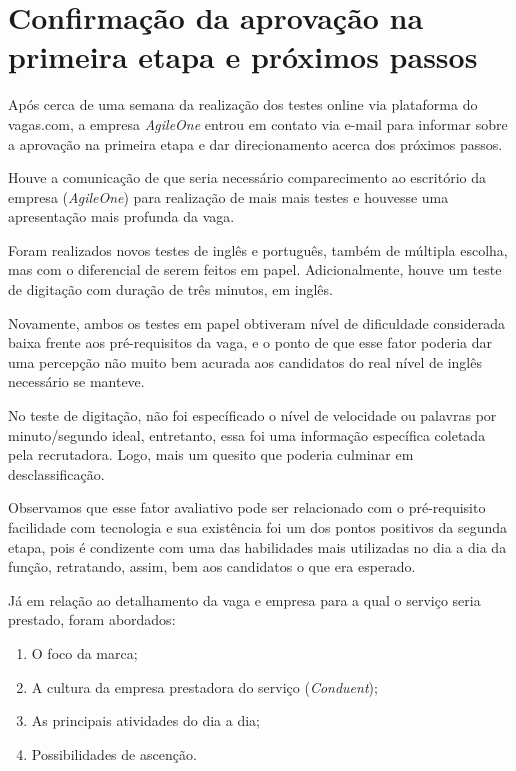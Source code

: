 \documentclass[12pt]{article}
\begin{document}
\maketitle


\section*{Confirmação da aprovação na primeira etapa e próximos passos}

Após cerca de uma semana da realização dos testes online via plataforma do vagas.com, a empresa \emph {AgileOne} entrou em contato via e-mail para informar sobre a aprovação na primeira etapa e dar direcionamento acerca dos próximos passos. 

Houve a comunicação de que seria necessário comparecimento ao escritório da empresa (\emph {AgileOne}) para realização de mais mais testes e houvesse uma apresentação mais profunda da vaga.

Foram realizados novos testes de inglês e português, também de múltipla escolha, mas com o diferencial de serem feitos em papel. Adicionalmente, houve um teste de digitação com duração de três minutos, em inglês. 

Novamente, ambos os testes em papel obtiveram nível de dificuldade considerada baixa frente aos pré-requisitos da vaga, e o ponto de que esse fator poderia dar uma percepção não muito bem acurada aos candidatos do real nível de inglês necessário se manteve. 

No teste de digitação, não foi específicado o nível de velocidade ou palavras por minuto/segundo ideal, entretanto, essa foi uma informação específica coletada pela recrutadora. Logo, mais um quesito que poderia culminar em desclassificação. 

Observamos que esse fator avaliativo pode ser relacionado com o pré-requisito facilidade com tecnologia e sua existência foi um dos pontos positivos da segunda etapa, pois é condizente com uma das habilidades mais utilizadas no dia a dia da função, retratando, assim, bem aos candidatos o que era esperado. 

Já em relação ao detalhamento da vaga e empresa para a qual o serviço seria prestado, foram abordados: 

\begin{enumerate}
   	\item O foco da marca;
	\item A cultura da empresa prestadora do serviço (\emph{Conduent});
   	\item As principais atividades do dia a dia; 
   	\item Possibilidades de ascenção. 
\end{enumerate}
\end{document}
